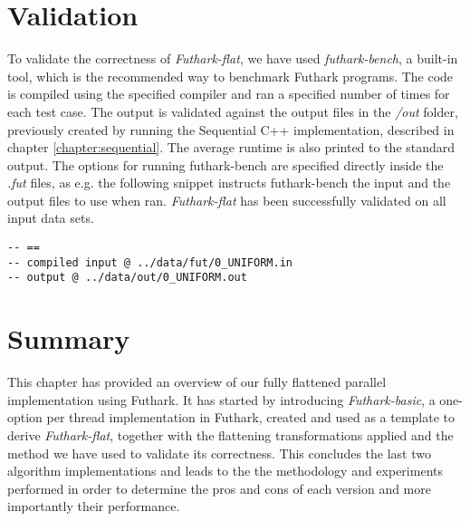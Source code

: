 \section{Validation}
To validate the correctness of \textit{Futhark-flat}, we have used \textit{futhark-bench}, a built-in tool, which is the recommended way to benchmark Futhark programs. The code is compiled using the specified compiler and ran a specified number of times for each test case. The output is validated against the output files in the \textit{/out} folder, previously created by running the Sequential C++ implementation, described in chapter \ref{chapter:sequential}. The average runtime is also printed to the standard output. The options for running futhark-bench are specified directly inside the \textit{.fut} files, as e.g. the following snippet instructs futhark-bench the input and the output files to use when ran. \textit{Futhark-flat} has been successfully validated on all input data sets.  
\begin{lstlisting}
-- ==
-- compiled input @ ../data/fut/0_UNIFORM.in
-- output @ ../data/out/0_UNIFORM.out
\end{lstlisting}
\section*{Summary}
This chapter has provided an overview of our fully flattened parallel implementation using Futhark. It has started by introducing \textit{Futhark-basic}, a one-option per thread implementation in Futhark, created and used as a template to derive \textit{Futhark-flat}, together with the flattening transformations applied and the method we have used to validate its correctness. This concludes the last two algorithm implementations and leads to the the methodology and experiments performed in order to determine the pros and cons of each version and more importantly their performance.   


